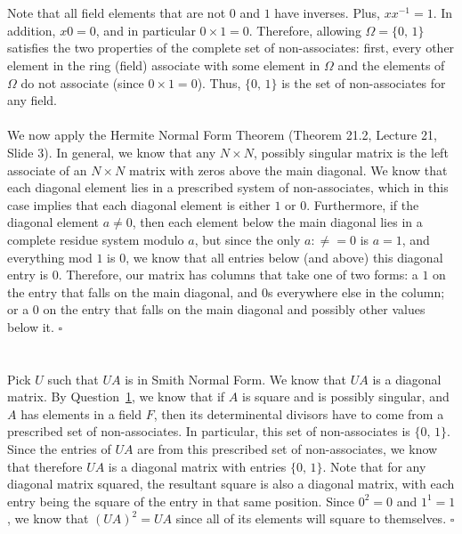 \documentclass[letterpaper]{article}
\newcommand*{\QED}{\hfill\ensuremath{\square}}%
\begin{document}
\section{}
\label{sec:Question3}

Note that all field elements that are not $ 0 $ and $ 1 $ have inverses.
Plus, $ xx^{-1} = 1 $.
In addition, $ x0 = 0 $, and in particular $ 0 \times 1 = 0 $.
Therefore, allowing $ \Omega = \{0, \, 1\} $ satisfies the two properties of the complete set of non-associates: first, every other element in the ring (field) associate with some element in $ \Omega $ and the elements of $ \Omega $ do not associate (since $ 0 \times 1 = 0 $).
Thus, $ \{0, \, 1\} $ is the set of non-associates for any field.
\\ \\
We now apply the Hermite Normal Form Theorem (Theorem 21.2, Lecture 21, Slide 3).
In general, we know that any $ N \times N $, possibly singular matrix is the left associate of an $ N \times N $ matrix with zeros above the main diagonal.
We know that each diagonal element lies in a prescribed system of non-associates, which in this case implies that each diagonal element is either $ 1 $ or $ 0 $.
Furthermore, if the diagonal element $ a \neq 0 $, then each element below the main diagonal lies in a complete residue system modulo $ a $, but since the only $ a : \neq = 0 $ is $ a = 1 $, and everything mod $ 1 $ is $ 0 $, we know that all entries below (and above) this diagonal entry is $ 0 $.
Therefore, our matrix has columns that take one of two forms: a $ 1 $ on the entry that falls on the main diagonal, and $ 0 $s everywhere else in the column; or a $ 0 $ on the entry that falls on the main diagonal and possibly other values below it.
\QED{}

\section{}
\label{sec:Question4}
Pick $ U $ such that $ UA $ is in Smith Normal Form.
We know that $ UA $ is a diagonal matrix.
By Question~\ref{sec:Question3}, we know that if $ A $ is square and is possibly singular, and $ A $ has elements in a field $ F $, then its determinental divisors have to come from a prescribed set of non-associates.
In particular, this set of non-associates is $ \{0, \, 1\} $.
Since the entries of $ UA $ are from this prescribed set of non-associates, we know that therefore $ UA $ is a diagonal matrix with entries $ \{0, \, 1\}$.
Note that for any diagonal matrix squared, the resultant square is also a diagonal matrix, with each entry being the square of the entry in that same position.
Since $ 0^2 = 0 $ and $ 1^1 = 1 $, we know that $ {(UA)}^2 = UA $ since all of its elements will square to themselves.
\QED{}
\end{document}
